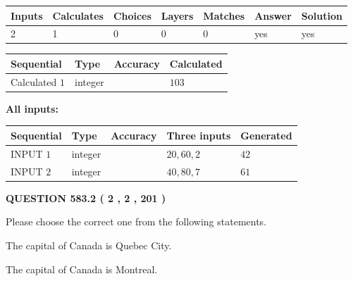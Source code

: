 \documentclass[12pt]{article}
\begin{document}
   
   
   
\noindent\begin{tabular}{|l|l|l|l|l|l|l|}
 \hline
Inputs & Calculates & Choices & Layers & Matches & Answer & Solution \\ \hline
 2  & 
 1  & 
 0
  & 
 0  & 
 0  & 
  yes & 
  yes 
  \\ \hline
 \end{tabular}
   
   
   
   
\noindent{}
   
   
  
  
\noindent\begin{tabular}{|l|l|l|l|}
\hline
 Sequential & Type & Accuracy & Calculated \\ 
\hline
 
 
  Calculated $  1 $ & integer &  & 
  $ 103 $ 
 \\  \hline  
 \end{tabular}
   
   
   
   
\noindent\vspace{0.1in}\hspace{-0.08in} {\textbf{\Large{All inputs: }}}
   
   
  
  
\noindent\begin{tabular}{|l|l|l|l|l|}
\hline
 Sequential & Type & Accuracy & Three inputs & Generated \\ 
\hline
 
 
  INPUT $  1 $ & integer &  & $
 20
 , 
 60
 , 
 2
 $ & $ 42 $ 
 \\  \hline  
 
 
  INPUT $  2 $ & integer &  & $
 40
 , 
 80
 , 
 7
 $ & $ 61 $ 
 \\  \hline  
 \end{tabular}
   
   
  
\vspace{0.2in}
  
{\textbf{\Large{QUESTION
583.2 
 ( 2 , 2 , 201 )
}}}
  
  
Please choose the correct one from the following statements.
 
 
The capital of Canada is Quebec City.
 
 
The capital of Canada is Montreal.
 
\end{document}
